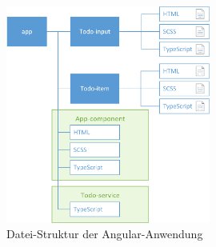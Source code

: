 \begin{figure}[h!]
	\includegraphics[width=0.6\textwidth]{img/pwa_dateistruktur.png}
	\centering
	\caption{Datei-Struktur der Angular-Anwendung}
	\label{fig:pwa_dateistruktur}
\end{figure}

